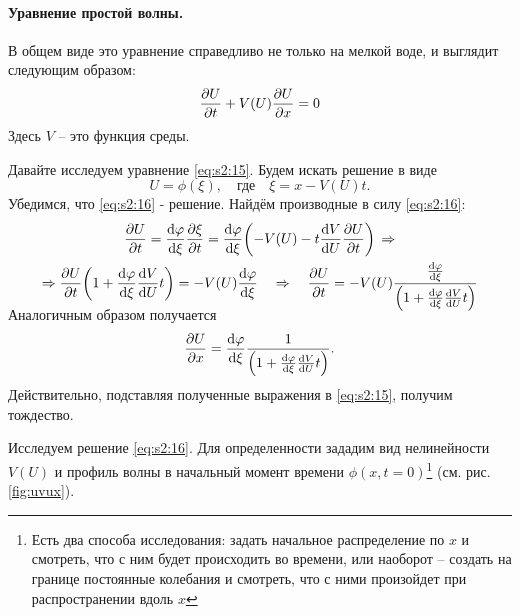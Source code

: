 \paragraph{Уравнение простой волны. } В общем виде это уравнение справедливо не только на мелкой воде, и выглядит следующим образом:
\begin{equation}
	\pdv{U}{t}+V(U)\pdv{U}{x} = 0
	\label{eq:s2:15}
\end{equation}
Здесь $V$ -- это функция среды. 

Давайте исследуем уравнение \eqref{eq:s2:15}. Будем искать решение в виде
\begin{equation}
	U = \phi(\xi), \quad \text{где}\quad
	\xi=x-V(U)t.
	\label{eq:s2:16}
\end{equation}
Убедимся, что \eqref{eq:s2:16} - решение. Найдём производные в силу \eqref{eq:s2:16}:
\begin{gather}
	\nonumber\pdv{U}{t}=\dv{\phi}{\xi}\pdv{\xi}{t}=\dv{\phi}{\xi}\qty(-V(U)-t\dv{V}{U}\pdv{U}{t})
	\,\Rightarrow \\ \Rightarrow 
	\pdv{U}{t}\qty(1+\dv{\phi}{\xi}\dv{V}{U}t)=-V(U)\dv{\phi}{\xi}
	\vspace{-0.5em}\quad \Rightarrow \vspace{-0.5em}\quad
	\pdv{U}{t}=-V(U)\frac{\dv{\phi}{\xi}}{\qty(1+\dv{\phi}{\xi}\dv{V}{U}t)}
	\label{eq:s2:6}
\end{gather}
Аналогичным образом получается
\begin{gather*}
	\pdv{U}{x}=\dv{\varphi}{\xi} \frac{1}{\qty(1+\dv{\varphi}{\xi}\dv{V}{U}t)}.
\end{gather*}
Действительно, подставляя полученные выражения в \eqref{eq:s2:15}, получим тождество.

Исследуем решение \eqref{eq:s2:16}. Для определенности зададим вид нелинейности $V(U)$ и профиль волны в начальный момент времени $\phi(x,t=0)$\footnote{Есть два способа исследования: задать начальное распределение по $x$ и смотреть, что с ним будет происходить во времени, или наоборот -- создать на границе постоянные колебания и смотреть, что с ними произойдет при распространении вдоль $x$} (см. рис. \ref{fig:uvux}).

